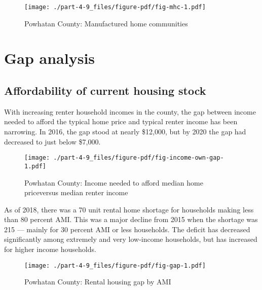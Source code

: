 \documentclass[
  letterpaper,
  DIV=11,
  numbers=noendperiod]{scrreprt}
\begin{document}
\begin{figure}

{\centering \texttt{[image: ./part-4-9\_files/figure-pdf/fig-mhc-1.pdf]}

}

\caption{\label{fig-mhc}Powhatan County: Manufactured home communities}

\end{figure}

\hypertarget{gap-analysis-8}{%
\section{Gap analysis}\label{gap-analysis-8}}

\hypertarget{affordability-of-current-housing-stock-8}{%
\subsection{Affordability of current housing
stock}\label{affordability-of-current-housing-stock-8}}

With increasing renter household incomes in the county, the gap between
income needed to afford the typical home price and typical renter income
has been narrowing. In 2016, the gap stood at nearly \$12,000, but by
2020 the gap had decreased to just below \$7,000.

\begin{figure}

{\centering \texttt{[image: ./part-4-9\_files/figure-pdf/fig-income-own-gap-1.pdf]}

}

\caption{\label{fig-income-own-gap}Powhatan County: Income needed to
afford median home priceversus median renter income}

\end{figure}

As of 2018, there was a 70 unit rental home shortage for households
making less than 80 percent AMI. This was a major decline from 2015 when
the shortage was 215 --- mainly for 30 percent AMI or less households.
The deficit has decreased significantly among extremely and very
low-income households, but has increased for higher income households.

\begin{figure}

{\centering \texttt{[image: ./part-4-9\_files/figure-pdf/fig-gap-1.pdf]}

}

\caption{\label{fig-gap}Powhatan County: Rental housing gap by AMI}

\end{figure}
\end{document}
